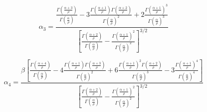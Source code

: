 \begin{frame}
    \begin{equation*}
        \alpha_3 = \frac{
                        \frac{ \Gamma \left (\frac{\alpha+3}{\rho}\right) }{ \Gamma \left (\frac{\alpha}{\rho} \right) }
                        - 3 \frac{ \Gamma \left (\frac{\alpha+1}{\rho} \right) \Gamma \left (\frac{\alpha+2}{\rho} \right) }{ \Gamma \left ( \frac{\alpha}{\rho} \right)^2 }
                        + 2 \frac{\Gamma \left (\frac{\alpha+1}{\rho} \right)^3}{\Gamma \left ( \frac{\alpha}{\rho} \right)^3}
                    }{
                        \left[ \frac{\Gamma \left (\frac{\alpha+2}{\rho} \right)}{{\Gamma \left ( \frac{\alpha}{\rho} \right)}} -
                        \frac{\Gamma \left (\frac{\alpha+1}{\rho} \right)^2}{{\Gamma \left ( \frac{\alpha}{\rho} \right)}^2} \right]^{3/2}
                    }
    \end{equation*}

    \vspace{1cm}

    \begin{equation*}
        \alpha_4 = \frac{ \beta \left[
                        \frac{ \Gamma \left (\frac{\alpha+4}{\rho}\right) }{ \Gamma \left (\frac{\alpha}{\rho} \right) }
                        - 4 \frac{ \Gamma \left (\frac{\alpha+1}{\rho}\right) \Gamma \left (\frac{\alpha+3}{\rho} \right)}{ \Gamma \left (\frac{\alpha}{\rho} \right)^2 }
                        + 6 \frac{ \Gamma \left (\frac{\alpha+1}{\rho} \right)^2 \Gamma \left (\frac{\alpha+2}{\rho} \right) }{ \Gamma \left ( \frac{\alpha}{\rho} \right)^3 }
                        - 3 \frac{\Gamma \left (\frac{\alpha+1}{\rho} \right)^4}{\Gamma \left ( \frac{\alpha}{\rho} \right)^4}
                        \right]
                    }{
                        \left[ \frac{\Gamma \left (\frac{\alpha+2}{\rho} \right)}{{\Gamma \left ( \frac{\alpha}{\rho} \right)}} -
                        \frac{\Gamma \left (\frac{\alpha+1}{\rho} \right)^2}{{\Gamma \left ( \frac{\alpha}{\rho} \right)}^2} \right]^{3/2}
                    }
    \end{equation*}
\end{frame}
